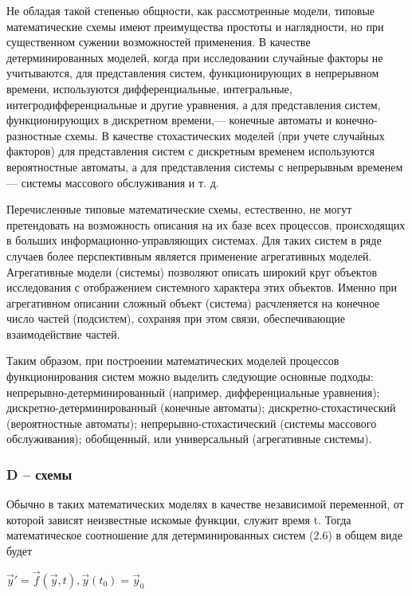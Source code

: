   Не обладая такой степенью общности, как рассмотренные модели, типовые математические схемы имеют преимущества простоты и наглядности, но при существенном сужении возможностей применения. В качестве детерминированных моделей, когда при исследовании случайные факторы не учитываются, для представления систем, функционирующих в непрерывном времени, используются дифференциальные, интегральные, интегродифференциальные и другие уравнения, а для представления систем, функционирующих в дискретном времени,— конечные автоматы и конечно-разностные схемы. В качестве стохастических моделей (при учете случайных факторов) для представления систем с дискретным временем используются вероятностные автоматы, а для представления системы с непрерывным временем — системы массового обслуживания и т. д.

  Перечисленные типовые математические схемы, естественно, не могут претендовать на возможность описания на их базе всех процессов, происходящих в больших информационно-управляющих системах. Для таких систем в ряде случаев более перспективным является применение агрегативных моделей. Агрегативные модели (системы) позволяют описать широкий круг объектов исследования с отображением системного характера этих объектов. Именно при агрегативном описании сложный объект (система) расчленяется на конечное число частей (подсистем), сохраняя при этом связи, обеспечивающие взаимодействие частей.

  Таким образом, при построении математических моделей процессов функционирования систем можно выделить следующие основные подходы: непрерывно-детерминированный (например, дифференциальные уравнения); дискретно-детерминированный (конечные автоматы); дискретно-стохастический (вероятностные автоматы); непрерывно-стохастический (системы массового обслуживания); обобщенный, или универсальный (агрегативные системы).

 \subsubsection{D -- схемы}

 Обычно в таких математических моделях в качестве независимой переменной, от которой зависят неизвестные искомые функции, служит время t. Тогда математическое соотношение для детерминированных систем (2.6) в общем виде будет

 \begin{center}
    $\vec{y}'= \vec{f}(\vec{y}, t), \vec{y}(t_{0}) = \vec{y}_{0}$
 \end{center}

